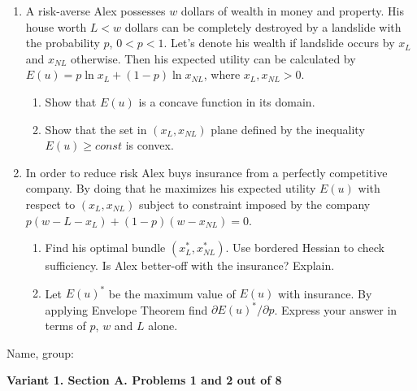 \documentclass[12pt,a4paper]{article}
\begin{document}
\begin{enumerate}[resume]
\item A risk-averse Alex possesses $w$ dollars of wealth in money and property.  His house worth $L < w$ dollars can be completely destroyed by a landslide with the probability $p$, $0 < p < 1$. Let’s denote his wealth if landslide occurs by $x_L$ and $x_{NL}$ otherwise. Then his expected utility can be calculated by $E(u) = p \ln x_L + (1-p) \ln x_{NL}$, where $x_L, x_{NL} > 0$.
\begin{enumerate}
\item Show that $E(u)$ is a concave function in its domain.
\item Show that the set in  $(x_L, x_{NL})$ plane defined by the inequality $E(u)\geq const$  is convex.
\end{enumerate}

\item In order to reduce risk Alex buys insurance from a perfectly competitive company. By doing that he maximizes his expected utility $E(u)$ with respect to $(x_L, x_{NL})$ subject to constraint imposed by the company $p(w-L-x_L)+(1-p)(w-x_{NL})=0$.
\begin{enumerate}
\item  Find his optimal bundle  $(x_L^*, x_{NL}^*)$. Use bordered Hessian to check sufficiency. Is Alex better-off with the insurance? Explain.
\item Let $E(u)^*$ be the maximum value of $E(u)$ with insurance. By applying Envelope Theorem find $\partial E(u)^* / \partial p$. Express your answer in terms of $p$, $w$ and $L$ alone.
\end{enumerate}


\end{enumerate}

\begin{framed}
\begin{minipage}{42em}
Name, group:\vspace*{3ex}\par 
\noindent\dotfill
\end{minipage}
\end{framed}



\newpage

\textbf{Variant 1. Section A. Problems 1 and 2 out of 8}
\end{document}
